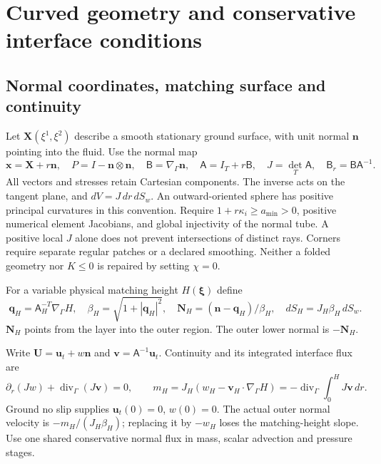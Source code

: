 \documentclass[11pt,a4paper]{article}
\numberwithin{equation}{section}
\begin{document}
\section{Curved geometry and conservative interface conditions}
\label{sec:wj-wall-curved}

\subsection{Normal coordinates, matching surface and continuity}
Let $\bm X(\xi^1,\xi^2)$ describe a smooth stationary ground surface,
with unit normal $\bm n$ pointing into the fluid. Use the normal map
\begin{equation}
 \bm x=\bm X+r\bm n,\quad
 P=I-\bm n\otimes\bm n,\quad
 \mathsf B=\nabla_\Gamma\bm n,\quad
 \mathsf A=I_T+r\mathsf B,\quad J=\det_T\mathsf A,
 \quad \mathsf B_r=\mathsf B\mathsf A^{-1}.
 \label{eq:wj-wall-map}
\end{equation}
All vectors and stresses retain Cartesian components. The inverse acts
on the tangent plane, and $dV=J\,dr\,dS_w$. An outward-oriented sphere
has positive principal curvatures in this convention. Require
$1+r\kappa_i\geq a_{\min}>0$, positive numerical element Jacobians,
and global injectivity of the normal tube. A positive local $J$ alone
does not prevent intersections of distinct rays. Corners require
separate regular patches or a declared smoothing. Neither a folded
geometry nor $K\leq0$ is repaired by setting $\chi=0$.

For a variable physical matching height $H(\bm\xi)$ define
\begin{equation}
 \bm q_H=\mathsf A_H^{-T}\nabla_\Gamma H,\quad
 \beta_H=\sqrt{1+|\bm q_H|^2},\quad
 \bm N_H=(\bm n-\bm q_H)/\beta_H,\quad
 dS_H=J_H\beta_H\,dS_w.
 \label{eq:wj-wall-interface-geometry}
\end{equation}
$\bm N_H$ points from the layer into the outer region. The outer
lower normal is $-\bm N_H$.

Write $\bm U=\bm u_t+w\bm n$ and $\bm v=\mathsf A^{-1}\bm u_t$.
Continuity and its integrated interface flux are
\begin{equation}
 \partial_r(Jw)+\operatorname{div}_\Gamma(J\bm v)=0,
 \qquad
 m_H=J_H(w_H-\bm v_H\cdot\nabla_\Gamma H)
 =-\operatorname{div}_\Gamma\int_0^H J\bm v\,dr.
 \label{eq:wj-wall-mass}
\end{equation}
Ground no slip supplies $\bm u_t(0)=0$, $w(0)=0$. The actual outer
normal velocity is $-m_H/(J_H\beta_H)$; replacing it by $-w_H$
loses the matching-height slope. Use one shared conservative normal
flux in mass, scalar advection and pressure stages.
\end{document}
